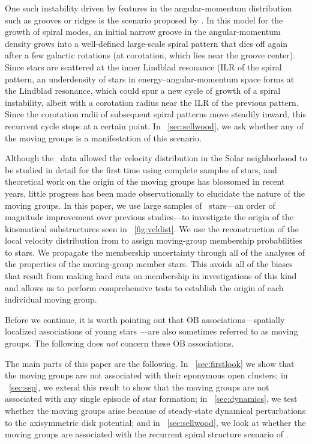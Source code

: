 One such instability driven by features in the angular-momentum
distribution such as grooves or ridges is the scenario proposed by
\citet{Sellwood91a} \citep[see also][]{Lovelace78a}. In this model for
the growth of spiral modes, an initial narrow groove in the
angular-momentum density grows into a well-defined large-scale spiral
pattern that dies off again after a few galactic rotations (at
corotation, which lies near the groove center). Since stars are
scattered at the inner Lindblad resonance (ILR of the spiral pattern,
an underdensity of stars in energy--angular-momentum space forms at
the Lindblad resonance, which could spur a new cycle of growth of a
spiral instability, albeit with a corotation radius near the ILR of
the previous pattern. Since the corotation radii of subsequent spiral
patterns move steadily inward, this recurrent cycle stops at a
certain point. In \sectionname~\ref{sec:sellwood}, we ask whether any
of the moving groups is a manifestation of this scenario.

Although the \Hipparcos\ data allowed the velocity distribution in the
Solar neighborhood to be studied in detail for the first time using
complete samples of stars, and theoretical work on the origin of the
moving groups has blossomed in recent years, little progress has been
made observationally to elucidate the nature of the moving groups. In
this paper, we use large samples of \Hipparcos\ stars---an order of
magnitude improvement over previous studies---to investigate the
origin of the kinematical substructures seen in
\figurename~\ref{fig:veldist}. We use the reconstruction of the local
velocity distribution from \citet{Bovyveldist} to assign moving-group
membership probabilities to stars. We propagate the membership
uncertainty through all of the analyses of the properties of the
moving-group member stars. This avoids all of the biases that result
from making hard cuts on membership in investigations of this kind and
allows us to perform comprehensive tests to establish the origin of
each individual moving group.

Before we continue, it is worth pointing out that OB
associations---spatially localized associations of young stars
\citep[\eg,][]{deZeeuw99a}---are also sometimes referred to as moving
groups. The following does \emph{not} concern these OB associations.

The main parts of this paper are the following. In
\sectionname~\ref{sec:firstlook} we show that the moving groups are
not associated with their eponymous open clusters; in
\sectionname~\ref{sec:ssp}, we extend this result to show that the
moving groups are not associated with any single episode of star
formation; in \sectionname~\ref{sec:dynamics}, we test whether the
moving groups arise because of steady-state dynamical perturbations to
the axisymmetric disk potential; and in
\sectionname~\ref{sec:sellwood}, we look at whether the moving groups
are associated with the recurrent spiral structure scenario of
\citet{Sellwood91a}.


